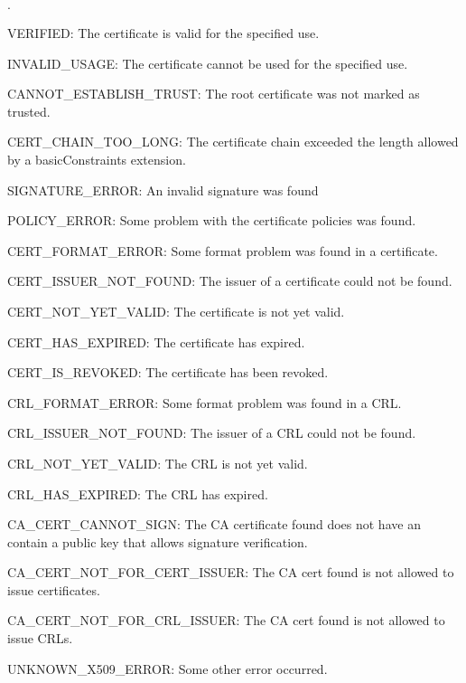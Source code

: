 \documentclass{article}
\begin{document}
\begin{list}{$\cdot$}
  \item VERIFIED: The certificate is valid for the specified use.
  \item
  \item INVALID\_USAGE: The certificate cannot be used for the specified use.

   \item CANNOT\_ESTABLISH\_TRUST: The root certificate was not marked as
         trusted.
   \item CERT\_CHAIN\_TOO\_LONG: The certificate chain exceeded the length
         allowed by a basicConstraints extension.
   \item SIGNATURE\_ERROR: An invalid signature was found
   \item POLICY\_ERROR: Some problem with the certificate policies was found.

   \item CERT\_FORMAT\_ERROR: Some format problem was found in a certificate.
   \item CERT\_ISSUER\_NOT\_FOUND: The issuer of a certificate could not be
         found.
   \item CERT\_NOT\_YET\_VALID: The certificate is not yet valid.
   \item CERT\_HAS\_EXPIRED: The certificate has expired.
   \item CERT\_IS\_REVOKED: The certificate has been revoked.

   \item CRL\_FORMAT\_ERROR: Some format problem was found in a CRL.
   \item CRL\_ISSUER\_NOT\_FOUND: The issuer of a CRL could not be found.
   \item CRL\_NOT\_YET\_VALID: The CRL is not yet valid.
   \item CRL\_HAS\_EXPIRED: The CRL has expired.

   \item CA\_CERT\_CANNOT\_SIGN: The CA certificate found does not have an
         contain a public key that allows signature verification.
   \item CA\_CERT\_NOT\_FOR\_CERT\_ISSUER: The CA cert found is not allowed to
         issue certificates.
   \item CA\_CERT\_NOT\_FOR\_CRL\_ISSUER: The CA cert found is not allowed to
         issue CRLs.

  \item UNKNOWN\_X509\_ERROR: Some other error occurred.

\end{list}
\end{document}
